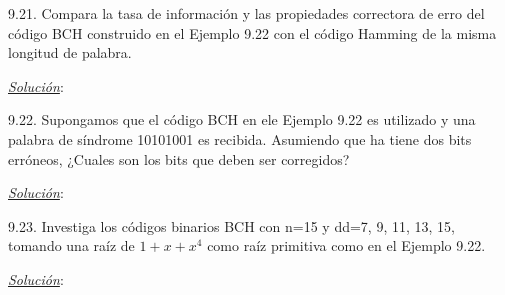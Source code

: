 

\begin{frame}  \small \begin{ejercicio} 

9.21. Compara la tasa de información y las propiedades correctora de erro del código BCH construido en el Ejemplo 9.22 con el código Hamming de la misma longitud de palabra.

\end{ejercicio} \pause \textit{\underline{Solución}}:\\ \end{frame} 


\begin{frame}  \small \begin{ejercicio} 

9.22. Supongamos que el código BCH en ele Ejemplo 9.22 es utilizado y una palabra de síndrome 10101001 es recibida. Asumiendo que ha tiene  dos bits erróneos, ¿Cuales son los bits que deben ser corregidos?

\end{ejercicio} \pause \textit{\underline{Solución}}:\\ \end{frame} 

\begin{frame}  \small \begin{ejercicio} 

9.23. Investiga los códigos binarios BCH con n=15 y dd=7, 9, 11, 13, 15, tomando una raíz de $1 + x + x^4$ como raíz primitiva como en el Ejemplo  9.22.

\end{ejercicio} \pause \textit{\underline{Solución}}:\\ \end{frame} 


